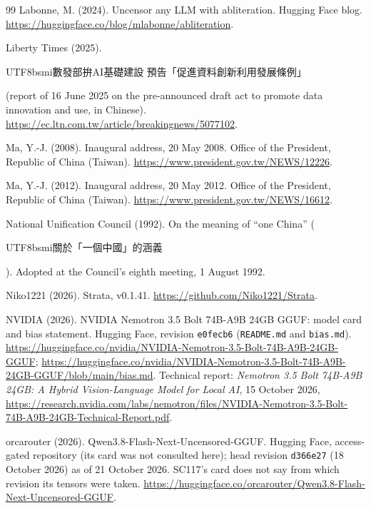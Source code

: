 \documentclass[11pt,a4paper]{article}
\newcommand{\zht}[1]{\begin{CJK}{UTF8}{bsmi}#1\end{CJK}}
\begin{document}
\begin{thebibliography}{99}
Labonne, M. (2024).
\newblock Uncensor any {LLM} with abliteration.
\newblock Hugging Face blog. \url{https://huggingface.co/blog/mlabonne/abliteration}.

Liberty Times (2025).
\newblock \zht{數發部拚AI基礎建設 預告「促進資料創新利用發展條例」} (report of 16 June 2025 on the pre-announced draft
act to promote data innovation and use, in Chinese).
\newblock \url{https://ec.ltn.com.tw/article/breakingnews/5077102}.

Ma, Y.-J. (2008).
\newblock Inaugural address, 20 May 2008. Office of the President, Republic of China (Taiwan).
\newblock \url{https://www.president.gov.tw/NEWS/12226}.

Ma, Y.-J. (2012).
\newblock Inaugural address, 20 May 2012. Office of the President, Republic of China (Taiwan).
\newblock \url{https://www.president.gov.tw/NEWS/16612}.

National Unification Council (1992).
\newblock On the meaning of ``one China'' (\zht{關於「一個中國」的涵義}).
\newblock Adopted at the Council's eighth meeting, 1 August 1992.

Niko1221 (2026).
\newblock Strata, v0.1.41.
\newblock \url{https://github.com/Niko1221/Strata}.

NVIDIA (2026).
\newblock NVIDIA Nemotron 3.5 Bolt 74B-A9B 24GB GGUF: model card and bias statement.
\newblock Hugging Face, revision \texttt{e0fecb6} (\texttt{README.md} and \texttt{bias.md}).
\newblock \url{https://huggingface.co/nvidia/NVIDIA-Nemotron-3.5-Bolt-74B-A9B-24GB-GGUF};
\url{https://huggingface.co/nvidia/NVIDIA-Nemotron-3.5-Bolt-74B-A9B-24GB-GGUF/blob/main/bias.md}. Technical report:
\emph{Nemotron 3.5 Bolt 74B-A9B 24GB: A Hybrid Vision-Language Model for Local AI}, 15 October 2026,
\url{https://research.nvidia.com/labs/nemotron/files/NVIDIA-Nemotron-3.5-Bolt-74B-A9B-24GB-Technical-Report.pdf}.

orcarouter (2026).
\newblock Qwen3.8-Flash-Next-Uncensored-GGUF.
\newblock Hugging Face, access-gated repository (its card was not consulted here); head revision \texttt{d366e27}
(18 October 2026) as of 21 October 2026. SC117's card does not say from which revision its tensors were taken.
\newblock \url{https://huggingface.co/orcarouter/Qwen3.8-Flash-Next-Uncensored-GGUF}.


\end{thebibliography}
\end{document}
